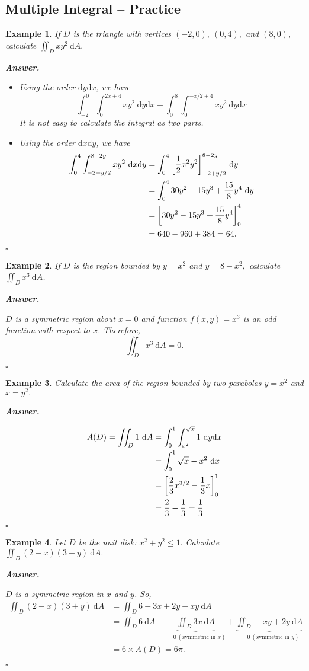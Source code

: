 \documentclass[12pt,a4paper]{article}
\newtheorem{eg}{Example}[subsection]
\newenvironment*{ans}{\par\indent\textbf{\textit{Answer. }}\par}{\par\hfill{$\square$}\par}
\def\dsst{\displaystyle}
\def\d{{\mathrm{d}}}
\def\dx{\d x}
\def\dy{\d y}
\def\dA{\d A}
\def\iintD{\dsst\iint_D}
\begin{document}
\subsection{Multiple Integral -- Practice}
\begin{eg}
	If $D$ is the triangle with vertices $(-2,0),\ (0,4),$ and $(8,0),$ calculate $\iintD xy^2\ \d A.$	
	\begin{ans}
	\begin{itemize}
		\item Using the order $\dy\dx$, we have \[\int_{-2}^0\int_{0}^{2x+4}xy^2\ \dy\dx+\int_0^8\int_0^{-x/2+4}xy^2\ \dy\dx\] It is not easy to calculate the integral as two parts.
		\item Using the order $\dx\dy$, we have \[\begin{aligned}\int_0^4\int_{-2+y/2}^{8-2y}xy^2\ \dx\dy&=\int_0^4\qty[\dfrac{1}{2}x^2y^2]_{-2+y/2}^{8-2y}\ \dy\\&=\int_0^430y^2-15y^3+\dfrac{15}{8}y^4\ \dy\\&=\qty[30y^2-15y^3+\dfrac{15}{8}y^4]_0^4\\&=640-960+384=64.\end{aligned}\]
	\end{itemize}	
	\end{ans}
\end{eg}
\begin{eg}
	If $D$ is the region bounded by $y=x^2$ and $y=8-x^2,$ calculate $\iintD x^3\ \dA$.
	\begin{ans}
		$D$ is a symmetric region about $x=0$ and function $f(x,y)=x^3$ is an odd function with respect to $x$. Therefore, \[\iintD x^3\ \dA=0.\]
	\end{ans}
\end{eg}
\begin{eg}
	Calculate the area of the region bounded by two parabolas $y=x^2$ and $x=y^2.$
	\begin{ans}
		\[\begin{aligned}A(D)=\iintD1\ \dA&=\int_0^1\int_{x^2}^{\sqrt{x}}1\ \dy\dx\\&=\int_0^1\sqrt{x}-x^2\ \dx\\&=\qty[\dfrac{2}{3}x^{3/2}-\dfrac{1}{3}x]_0^1\\&=\dfrac{2}{3}-\dfrac{1}{3}=\dfrac{1}{3}\end{aligned}\]
	\end{ans}
\end{eg}
\begin{eg}
	Let $D$ be the unit disk: $x^2+y^2\leq1.$ Calculate $\iintD(2-x)(3+y)\ \dA.$
	\begin{ans}
		$D$ is a symmetric region in $x$ and $y$. So, \[\begin{aligned}\iintD(2-x)(3+y)\ \dA &=\iintD6-3x+2y-xy\ \dA\\&=\iintD6\ \dA-\underbrace{\iintD 3x\ \dA}_{=0\ (\text{symmetric in }x)}+\underbrace{\iintD-xy+2y\ \dA}_{=0\ (\text{symmetric in }y)}\\&=6\times A(D)=6\pi.\end{aligned}\]
	\end{ans}	
\end{eg}
\end{document}
